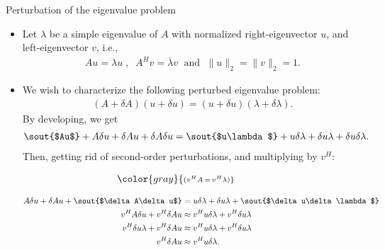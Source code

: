 \documentclass[t,usepdftitle=false]{beamer}
\begin{document}
\begin{frame}{Perturbation of the eigenvalue problem}
\begin{itemize}
\item Let $\lambda$ be a simple eigenvalue of $A$ with normalized right-eigenvector $u$, and left-eigenvector $v$, i.e.,
\begin{align*}
Au=\lambda u
\;,\;\;
A^Hv=\overline{\lambda}v
\;\text{ and }\;
\|u\|_2=\|v\|_2=1.
\end{align*}
\item We wish to characterize the following perturbed eigenvalue problem:
\begin{align*}
(A+\delta A)(u+\delta u)=(u+\delta u)(\lambda+\delta \lambda).
\end{align*}
By developing, we get
\begin{align*}
\hbox{\sout{$Au$}}+A\delta u+\delta Au+\delta A\delta u=&\;
\hbox{\sout{$u\lambda$}}+u\delta \lambda+\delta u\lambda+\delta u\delta \lambda.
\end{align*}
Then, getting rid of second-order perturbations, and multiplying by $v^H$:\vspace{-.6cm}\\
\begin{minipage}[t]{0.25\textwidth}
\vspace{.97cm}
\begin{align*}
\hspace{-1.2cm}\color{gray}{\scriptstyle(v^HA\,=\,v^H\lambda)}
\end{align*}
\end{minipage}
\hspace{-1.25cm}\begin{minipage}[t]{0.65\textwidth}
\begin{align*}
A\delta u+\delta Au+\hbox{\sout{$\delta A\delta u$}}=&\;
u\delta \lambda+\delta u\lambda+\hbox{\sout{$\delta u\delta \lambda$}}\\
v^HA\delta u+v^H\delta Au\approx&\;v^Hu\delta \lambda+v^H\delta u\lambda\\
v^H\delta u\lambda+v^H\delta Au\approx&\;v^Hu\delta \lambda+v^H\delta u\lambda\\
v^H\delta Au\approx&\;v^Hu\delta \lambda.
\end{align*}
\end{minipage}
\end{itemize}
\end{frame}
\end{document}

